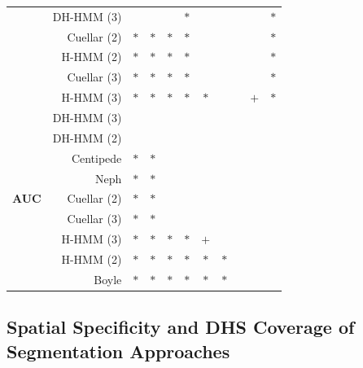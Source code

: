 \documentclass{bioinfo}
\begin{document}
\begin{table}[t]
\begin{center}
\begin{tabularx}{0.45\textwidth}{lrccccccccc}
    & DH-HMM (3)  &     &     &     & $*$ &     &     &     &     & $*$ \\
    & Cuellar (2) & $*$ & $*$ & $*$ & $*$ &     &     &     &     & $*$ \\
    & H-HMM (2)   & $*$ & $*$ & $*$ & $*$ &     &     &     &     & $*$ \\
    & Cuellar (3) & $*$ & $*$ & $*$ & $*$ &     &     &     &     & $*$ \\
    & H-HMM (3)   & $*$ & $*$ & $*$ & $*$ & $*$ &     &     & $+$ & $*$ \\
  \hline
    \multirow{9}{*}{\begin{sideways}\textbf{AUC}\end{sideways}}
    & DH-HMM (3)  &     &     &     &     &     &     &     &     &     \\
    & DH-HMM (2)  &     &     &     &     &     &     &     &     &     \\
    & Centipede   & $*$ & $*$ &     &     &     &     &     &     &     \\
    & Neph        & $*$ & $*$ &     &     &     &     &     &     &     \\
    & Cuellar (2) & $*$ & $*$ &     &     &     &     &     &     &     \\
    & Cuellar (3) & $*$ & $*$ &     &     &     &     &     &     &     \\
    & H-HMM (3)   & $*$ & $*$ & $*$ & $*$ & $+$ &     &     &     &     \\
    & H-HMM (2)   & $*$ & $*$ & $*$ & $*$ & $*$ & $*$ &     &     &     \\
    & Boyle       & $*$ & $*$ & $*$ & $*$ & $*$ & $*$ &     &     &     \\
  \hline
  \end{tabularx}
\end{center}
\vspace{-1.0cm}
\end{table}

\subsection{Spatial Specificity {\color{red} and DHS Coverage} of Segmentation Approaches}
\label{sec:spatial.specificity}
\end{document}
